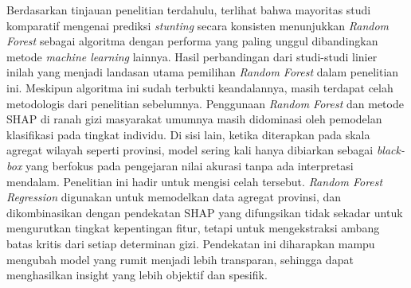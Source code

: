 Berdasarkan tinjauan penelitian terdahulu, terlihat bahwa mayoritas studi komparatif mengenai prediksi \textit{stunting} secara konsisten menunjukkan \textit{Random Forest} sebagai algoritma dengan performa yang paling unggul dibandingkan metode \textit{machine learning} lainnya. Hasil perbandingan dari studi-studi linier inilah yang menjadi landasan utama pemilihan \textit{Random Forest} dalam penelitian ini. Meskipun algoritma ini sudah terbukti keandalannya, masih terdapat celah metodologis dari penelitian sebelumnya. Penggunaan \textit{Random Forest} dan metode SHAP di ranah gizi masyarakat umumnya masih didominasi oleh pemodelan klasifikasi pada tingkat individu. Di sisi lain, ketika diterapkan pada skala agregat wilayah seperti provinsi, model sering kali hanya dibiarkan sebagai \textit{black-box} yang berfokus pada pengejaran nilai akurasi tanpa ada interpretasi mendalam. Penelitian ini hadir untuk mengisi celah tersebut. \textit{Random Forest Regression} digunakan untuk memodelkan data agregat provinsi, dan dikombinasikan dengan pendekatan SHAP yang difungsikan tidak sekadar untuk mengurutkan tingkat kepentingan fitur, tetapi untuk mengekstraksi ambang batas kritis dari setiap determinan gizi. Pendekatan ini diharapkan mampu mengubah model yang rumit menjadi lebih transparan, sehingga dapat menghasilkan insight yang lebih objektif dan spesifik.

